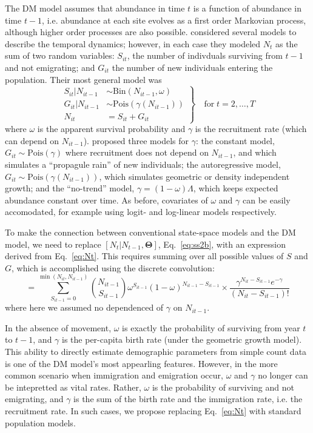 \documentclass[12pt]{article}
\begin{document}
The DM model assumes that abundance in time $t$ is a function of
abundance in time $t-1$, i.e. abundance at each site evolves as a
first order Markovian process, although
higher order processes are also possible.  \citet{dail_madsen:2011}
considered several models to describe the temporal dynamics; however,
in each case they modeled $N_t$ as the sum of two random variables:
$S_{it}$, the number of indivduals surviving from $t-1$ and not
emigrating; and $G_{it}$ the number of new individuals entering the
population. Their most general model was
\begin{equation}
\left.\begin{aligned}
S_{it}|N_{it-1} &\sim \mathrm{Bin}(N_{it-1}, \omega) \\
G_{it}|N_{it-1} &\sim \mathrm{Pois}(\gamma(N_{it-1})) \\
N_{it} &= S_{it}+G_{it}
\end{aligned}\right\} \quad \text{for} \; t=2,\hdots,T
\label{eq:Nt}
\end{equation}
where $\omega$ is the apparent survival probability and $\gamma$ is
the recruitment rate (which can depend on $N_{it-1}$).
\citet{dail_madsen:2011} proposed three
models for $\gamma$: the constant model,
$G_{it} \sim \mathrm{Pois}(\gamma)$ where recruitment does not depend on
$N_{it-1}$, and which simulates a ``propagule rain'' of new individuals; the
autoregressive model, $G_{it} \sim \mathrm{Pois}(\gamma(N_{it-1}))$, which
simulates geometric or density independent growth; and the
``no-trend'' model, $\gamma = (1-\omega)\Lambda$, which keeps
expected abundance constant over time. As before, covariates of
$\omega$ and $\gamma$ can be easily accomodated, for example using
logit- and log-linear models respectively.

To make the connection between conventional state-space models and the
DM model, we need to replace $[N_t|N_{t-1}, \bm{\Theta}]$,
Eq.~\ref{eq:ss2b}, with an expression derived from
Eq.~\ref{eq:Nt}. This requires summing over all possible values of $S$
and $G$, which is accomplished using the discrete convolution:
\begin{equation}
[N_{it}|N_{it-1}, \omega, \gamma] =
  \sum_{S_{it-1}=0}^{\min(N_{it},N_{it-1})}
  \binom{N_{it-1}}{S_{it-1}}\omega^{S_{it-1}}(1-\omega)^{N_{it-1}-S_{it-1}} \times
  \frac{\gamma^{N_{it}-S_{it-1}}e^{-\gamma}}{(N_{it}-S_{it-1})!}
  \label{eq:P}
\end{equation}
where here we assumed no dependenced of $\gamma$ on $N_{it-1}$.

In the absence
of movement, $\omega$ is exactly the probability of surviving from
year $t$ to $t-1$, and $\gamma$ is the per-capita birth rate (under
the geometric growth model). This ability to directly estimate
demographic parameters from simple count data is one of the DM model's
most appearling features. However,
in the more common scenario when immigration and emigration occur,
$\omega$ and $\gamma$ no longer can be intepretted as vital
rates. Rather, $\omega$ is the probability of surviving and not
emigrating, and
$\gamma$ is the sum of the birth rate and the immigration rate,
i.e. the recruitment rate. In such cases, we propose
replacing Eq.~\ref{eq:Nt} with standard
population models.
\end{document}
